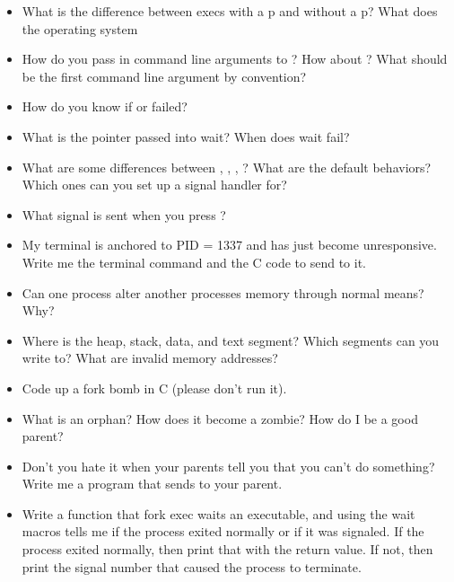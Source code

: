 \begin{itemize}
    \item
          What is the difference between execs with a p and without a p? What does the operating system
    \item
          How do you pass in command line arguments to ? How about ? What should be the first command line argument by convention?
    \item
          How do you know if  or  failed?
    \item
          What is the  pointer passed into wait? When does wait fail?
    \item
          What are some differences between , , , ? What are the default behaviors? Which ones can you set up a signal handler for?
    \item
          What signal is sent when you press ?
    \item
          My terminal is anchored to PID = 1337 and has just become unresponsive. Write me the terminal command and the C code to send  to it.
    \item
          Can one process alter another processes memory through normal means? Why?
    \item
          Where is the heap, stack, data, and text segment? Which segments can you write to? What are invalid memory addresses?
    \item
          Code up a fork bomb in C (please don't run it).
    \item
          What is an orphan? How does it become a zombie? How do I be a good parent?
    \item
          Don't you hate it when your parents tell you that you can't do something? Write me a program that sends  to your parent.
    \item
          Write a function that fork exec waits an executable, and using the wait macros tells me if the process exited normally or if it was signaled. If the process exited normally, then print that with the return value. If not, then print the signal number that caused the process to terminate.
\end{itemize}



